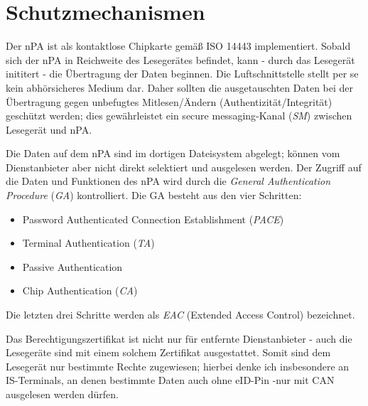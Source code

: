 \documentclass[toc=flat,fontsize=11pt,a4paper,titlepage,headsepline,numbers=noenddot, bibliography=totoc]{scrartcl}
\begin{document}
\section{Schutzmechanismen}

Der nPA ist als kontaktlose Chipkarte gemäß ISO 14443 \cite{ISO14443} implementiert. Sobald sich der nPA in Reichweite des Lesegerätes befindet, kann - durch das 
Lesegerät inititert - die Übertragung der Daten beginnen. Die Luftschnittstelle stellt per se kein abhörsicheres  Medium dar. Daher sollten die ausgetauschten Daten 
bei der Übertragung gegen unbefugtes Mitlesen/Ändern (Authentizität/Integrität) geschützt werden; dies gewährleistet ein secure messaging-Kanal (\textit{SM}) zwischen 
Lesegerät und nPA. 

Die Daten auf dem nPA sind im dortigen Dateisystem abgelegt; können vom Dienstanbieter aber nicht direkt selektiert und ausgelesen werden. Der Zugriff auf 
die Daten und Funktionen des nPA  wird durch die \textit{General Authentication Procedure} (\textit{GA}) \cite{TR3110} kontrolliert. Die GA besteht aus den vier Schritten:
\begin{itemize}
	\item Password Authenticated Connection Establishment (\textit{PACE}) \cite{TR3110}
	\item Terminal Authentication (\textit{TA})
	\item Passive Authentication 
	\item Chip Authentication (\textit{CA}) 
\end{itemize}
Die letzten drei Schritte werden als \textit{EAC} (Extended Access Control) bezeichnet.

Das Berechtigungszertifikat ist nicht nur für entfernte Dienstanbieter - auch die Lesegeräte sind mit einem solchem Zertifikat ausgestattet. Somit sind dem Lesegerät nur bestimmte Rechte zugewiesen; hierbei denke ich insbesondere an IS-Terminals, an denen bestimmte Daten auch ohne eID-Pin -nur mit CAN ausgelesen werden dürfen.
\end{document}
